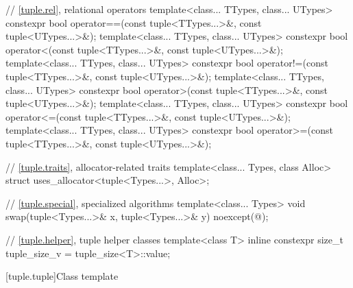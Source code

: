 \begin{codeblock}
{  // \ref{tuple.rel}, relational operators
  template<class... TTypes, class... UTypes>
    constexpr bool operator==(const tuple<TTypes...>&, const tuple<UTypes...>&);
  template<class... TTypes, class... UTypes>
    constexpr bool operator<(const tuple<TTypes...>&, const tuple<UTypes...>&);
  template<class... TTypes, class... UTypes>
    constexpr bool operator!=(const tuple<TTypes...>&, const tuple<UTypes...>&);
  template<class... TTypes, class... UTypes>
    constexpr bool operator>(const tuple<TTypes...>&, const tuple<UTypes...>&);
  template<class... TTypes, class... UTypes>
    constexpr bool operator<=(const tuple<TTypes...>&, const tuple<UTypes...>&);
  template<class... TTypes, class... UTypes>
    constexpr bool operator>=(const tuple<TTypes...>&, const tuple<UTypes...>&);

  // \ref{tuple.traits}, allocator-related traits
  template<class... Types, class Alloc>
    struct uses_allocator<tuple<Types...>, Alloc>;

  // \ref{tuple.special}, specialized algorithms
  template<class... Types>
    void swap(tuple<Types...>& x, tuple<Types...>& y) noexcept(@\seebelow@);

  // \ref{tuple.helper}, tuple helper classes
  template<class T>
    inline constexpr size_t tuple_size_v = tuple_size<T>::value;
}
\end{codeblock}

[tuple.tuple]{Class template }
%

